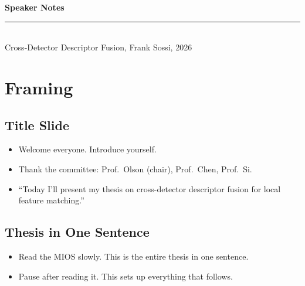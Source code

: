 \documentclass[11pt, letterpaper]{article}
\begin{document}
{\headingfont\bfseries\LARGE\color{uwpurple} Speaker Notes}\\[2pt]
{\color{uwmetallic}\rule{4cm}{2pt}}\\[6pt]
{\large Cross-Detector Descriptor Fusion, Frank Sossi, 2026}

\bigskip

\section{Framing}

\subsection{Title Slide}
\begin{itemize}
  \item Welcome everyone. Introduce yourself.
  \item Thank the committee: Prof.\ Olson (chair), Prof.\ Chen, Prof.\ Si.
  \item ``Today I'll present my thesis on cross-detector descriptor fusion for local feature matching.''
\end{itemize}

\subsection{Thesis in One Sentence}
\begin{itemize}
  \item Read the MIOS slowly. This is the entire thesis in one sentence.
  \item Pause after reading it. This sets up everything that follows.
\end{itemize}

\end{document}
